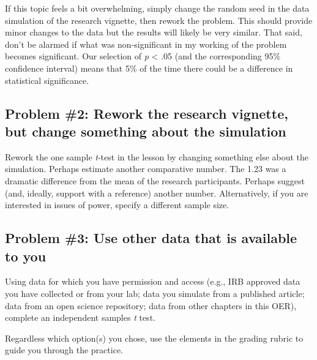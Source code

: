 \documentclass[
  11pt,
]{book}
\begin{document}
If this topic feels a bit overwhelming, simply change the random seed in the data simulation of the research vignette, then rework the problem. This should provide minor changes to the data but the results will likely be very similar. That said, don't be alarmed if what was non-significant in my working of the problem becomes significant. Our selection of \emph{p} \textless{} .05 (and the corresponding 95\% confidence interval) means that 5\% of the time there could be a difference in statistical significance.

\hypertarget{problem-2-rework-the-research-vignette-but-change-something-about-the-simulation}{%
\subsection{Problem \#2: Rework the research vignette, but change something about the simulation}\label{problem-2-rework-the-research-vignette-but-change-something-about-the-simulation}}

Rework the one sample \emph{t}-test in the lesson by changing something else about the simulation. Perhaps estimate another comparative number. The 1.23 was a dramatic difference from the mean of the research participants. Perhaps suggest (and, ideally, support with a reference) another number. Alternatively, if you are interested in issues of power, specify a different sample size.

\hypertarget{problem-3-use-other-data-that-is-available-to-you}{%
\subsection{Problem \#3: Use other data that is available to you}\label{problem-3-use-other-data-that-is-available-to-you}}

Using data for which you have permission and access (e.g., IRB approved data you have collected or from your lab; data you simulate from a published article; data from an open science repository; data from other chapters in this OER), complete an independent samples \emph{t} test.

Regardless which option(s) you chose, use the elements in the grading rubric to guide you through the practice.
\end{document}
